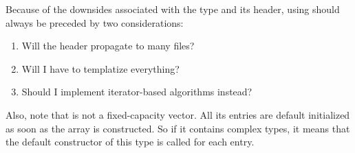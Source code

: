 \begin{guideline}
  Because of the downsides associated with the type and its header,
  using  should always be preceded by two
  considerations:

  \begin{enumerate}
  \item Will the header propagate to many files?
  \item Will I have to templatize everything?
  \item Should I implement iterator-based algorithms instead?
  \end{enumerate}
\end{guideline}

Also, note that  is not a fixed-capacity vector. All
its entries are default initialized as soon as the array is
constructed. So if it contains complex types, it means that the
default constructor of this type is called for each entry.
